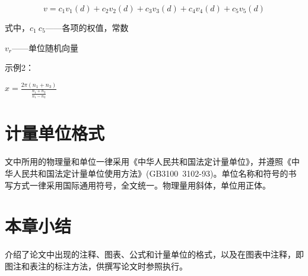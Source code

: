 \begin{equation}
v = {c_1}{v_1}(d) + {c_2}{v_2}(d) + {c_3}{v_3}(d) + {c_4}{v_4}(d) + {c_5}{v_5}(d) \label{gongshi3.2}
\end{equation}

式中，$ c_{1}~c_{5}$——各项的权值，常数

     \hspace*{1.1cm}  ${v_r}$——单位随机向量
     
     示例2：
     
     {\large $x = \frac{{2\pi ({n_1} + {n_3})}}{{\frac{{{n_1} + {n_2}}}{{{n_1} - {n_2}}}}}$}
     
     
\section{计量单位格式}

文中所用的物理量和单位一律采用《中华人民共和国法定计量单位》，并遵照《中华人民共和国法定计量单位使用方法》(GB3100~3102-93)。单位名称和符号的书写方式一律采用国际通用符号，全文统一。物理量用斜体，单位用正体。

\section{本章小结}

介绍了论文中出现的注释、图表、公式和计量单位的格式，以及在图表中注释，即图注和表注的标注方法，供撰写论文时参照执行。 
